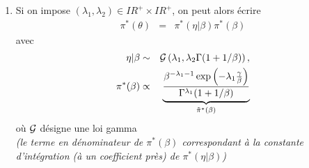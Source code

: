\documentclass[10pt]{article}
\newcommand{\R}{I\!\!R}
\newcommand{\E}{\mbox{E}}
\newcommand{\1}{\mathbbm{1}}
\begin{document}
\begin{enumerate}
\begin{enumerate}
\begin{eqnarray}
\int_S x m_{\pi}(x) \ dx & = & x_e \ = \ \int_{\Theta} \E[X|\theta] \pi(\theta)  \ d\theta \label{mean1}
\end{eqnarray}
avec $\E_{\theta}[X]=\eta\Gamma(1+1/\beta)$. 
\end{enumerate}
Alors la solution du probl\`eme de maximisation d'entropie s'\'ecrit, en introduisant $(\lambda_1,\lambda_2)\in\R^2$ des multiplicateurs de Lagrange,
\begin{eqnarray*}
\pi^*(\theta) & \propto & \pi^J(\theta) \exp\left(-\lambda_1 Z(\theta) - \lambda_2\E[X|\theta]\right), \\
& \propto &  \beta^{-\lambda_1-1} \eta^{\lambda_1-1} \exp\left(-\lambda_2 \eta\Gamma(1+1/\beta)\right) \exp\left(-\lambda_1 \frac{\gamma}{\beta}\right)
\end{eqnarray*}
\item Si on impose $(\lambda_1,\lambda_2)\in\R^+\times \R^+$, on peut alors \'ecrire
\begin{eqnarray*}
\pi^*(\theta) & = & \pi^*(\eta|\beta)\pi^*(\beta)
\end{eqnarray*}
avec
\begin{eqnarray*}
\eta|\beta & \sim & {\cal{G}}\left(\lambda_1,\lambda_2 \Gamma(1+1/\beta)\right), \\
\pi^*(\beta) & \propto & \underbrace{\frac{\beta^{-\lambda_1-1}\exp\left(-\lambda_1 \frac{\gamma}{\beta}\right)}{\Gamma^{\lambda_1}(1+1/\beta)}}_{\tilde{\pi}^*(\beta)}
\end{eqnarray*}
o\`u ${\cal{G}}$ d\'esigne une loi gamma \\
{\it (le terme en d\'enominateur de $\pi^*(\beta)$ correspondant \`a la constante d'int\'egration (\`a un coefficient pr\`es) de $\pi^*(\eta|\beta)$)}


\end{enumerate}
\end{document}

